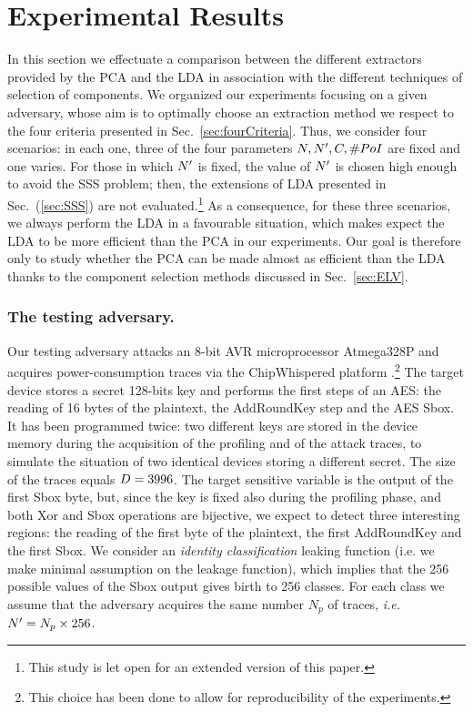 \section{Experimental Results}\label{sec:experiments}

In this section we effectuate a comparison between the different extractors provided by the PCA and the LDA in association with the different techniques of selection of components. We organized our experiments focusing on a given adversary, whose aim is to optimally choose an extraction method we respect to the four criteria presented in Sec.~\ref{sec:fourCriteria}. Thus, we consider four scenarios: in each one, three of the four parameters $\numTraces[], \numTraces[]', \newTraceLength, \numPoI$ are fixed and one varies. For those in which $\numTraces[]'$ is fixed, the value of $\numTraces[]'$ is chosen high enough to avoid the SSS problem; then, the extensions of LDA presented in Sec.~(\ref{sec:SSS}) are not evaluated.\footnote{This study is let open for an extended version of this paper.} As a consequence, for these three scenarios, we always perform the LDA in a favourable situation, which makes expect the LDA to be more efficient than the PCA in our experiments. Our goal is therefore only to study whether the PCA can be made almost as efficient than the LDA thanks to the component selection methods discussed in Sec.~\ref{sec:ELV}. 



\subsubsection{The testing adversary.}  Our testing adversary attacks an 8-bit AVR microprocessor Atmega328P and acquires power-consumption traces via the ChipWhispered platform \cite{o2014chipwhisperer}.\footnote{This choice has been done to allow for reproducibility of the experiments.} The target device stores a secret 128-bits key and performs the first steps of an AES: the reading of 16 bytes of the plaintext, the AddRoundKey step and the AES Sbox. It has been programmed twice: two different keys are stored in the device memory during the acquisition of the profiling and of the attack traces, to simulate the situation of two identical devices storing a different secret. The size of the traces equals $\traceLength = 3996$. The target sensitive variable is the output of the first Sbox byte, but, since the key is fixed also during the profiling phase, and both Xor and Sbox operations are bijective, we expect to detect three interesting regions: the reading of the first byte of the plaintext, the first AddRoundKey and the first Sbox. We consider an {\em identity classification} leaking function (i.e. we make minimal assumption on the leakage function), which implies that the 256 possible values of the Sbox output gives birth to 256 classes. For each class we assume that the adversary acquires the same number $N_p$ of traces, \textit{i.e.} $\numTraces[]' = N_p\times 256$.\\

